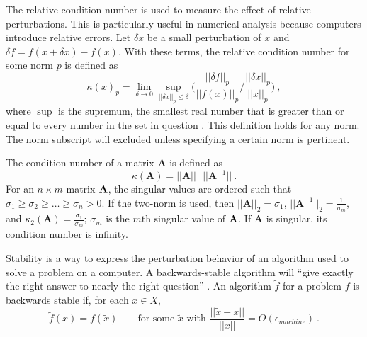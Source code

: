 The relative condition number is used to measure the effect of relative perturbations. This is particularly useful in numerical analysis because computers introduce relative errors. Let $\delta x$ be a small perturbation of $x$ and $\delta f = f(x + \delta x) - f(x)$. With these terms, the relative condition number for some norm $p$ is defined as
%
\begin{equation}
  \kappa(x)_{p} = \lim_{\delta \rightarrow 0} \sup_{||\delta x||_{p} \le \delta} \biggl(\frac{||\delta f||_{p}}{||f(x)||_{p}} / \frac{||\delta x||_{p}}{||x||_{p}} \biggr)  \:,
  \label{eq:cond}
\end{equation}
%
where $\sup$ is the supremum, the smallest real number that is greater than or equal to every number in the set in question \cite{Wikipedia2011}. This definition holds for any norm. The norm subscript will excluded unless specifying a certain norm is pertinent.

The condition number of a matrix $\mathbf{A}$ is defined as
%
\begin{equation}
  \kappa(\mathbf{A}) = ||\mathbf{A}|| \text{ }||\mathbf{A}^{-1}|| \:.
  \label{eq:condA}
\end{equation}
%
For an $n \times m$ matrix $\mathbf{A}$, the singular values are ordered such that $\sigma_{1} \ge \sigma_{2} \ge \dots \ge \sigma_{n} > 0$. If the two-norm is used, then $||\mathbf{A}||_{2} = \sigma_{1}$, $||\mathbf{A}^{-1}||_{2} = \frac{1}{\sigma_{m}}$, and $\kappa_{2}(\mathbf{A}) = \frac{\sigma_{1}}{\sigma_{m}}$; $\sigma_{m}$ is the $m$th singular value of $\mathbf{A}$. If $\mathbf{A}$ is singular, its condition number is infinity. 

Stability is a way to express the perturbation behavior of an algorithm used to solve a problem on a computer. %
%
A backwards-stable algorithm will ``give exactly the right answer to nearly the right question'' \cite{Trefethen1997}. An algorithm $\tilde{f}$ for a problem $f$ is backwards stable if, for each $x \in X$,
%
\begin{equation}
  \tilde{f}(x) = f(\tilde{x}) \qquad \text{for some } \tilde{x} \text{ with } \frac{||\tilde{x} - x||}{||x||} = O(\epsilon _{machine}) \:.
  \label{eq:back stable}
\end{equation}

